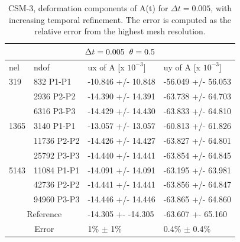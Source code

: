 \begin{table}[h!]
\centering
\begin{tabular}{ |p{1cm}||p{2.7cm}|p{3.3cm}|p{3.3cm}|}
\hline
  \multicolumn{4}{|c|}{$\Delta t = 0.005 \hspace{2mm} \theta = 0.5$} \\
\hline
nel & ndof & ux of A [x $10^{-3}$]  &uy of A [x $10^{-3}$] \\
\hline
    319     & 832 P1-P1 & -10.846       +/-  10.848 & -56.049       +/-  56.053 \\
     & 2936 P2-P2  & -14.390       +/-  14.391 & -63.738       +/-  64.703 \\
      & 6316 P3-P3 & -14.429       +/-  14.430 & -63.833       +/-  64.810 \\
 \hline 
    1365    & 3140 P1-P1 & -13.057       +/-  13.057 & -60.813       +/-  61.826 \\
     & 11736 P2-P2& -14.426       +/-  14.427 & -63.827       +/-  64.801 \\
     & 25792 P3-P3 & -14.440       +/-  14.441 & -63.854       +/-  64.845 \\
 \hline
      5143    & 11084 P1-P1 & -14.091       +/-  14.091 & -63.195       +/-  63.981 \\
     & 42736 P2-P2 & -14.441       +/-  14.441 & -63.856       +/-  64.847 \\
     & 94960 P3-P3 & -14.446       +/-  14.446 & -63.865       +/-  64.860 \\
 \hline
  \multicolumn{2}{|c|}{Reference}  &-14.305 +- -14.305        & -63.607 +- 65.160    \\
   \hline
    \multicolumn{2}{|c|}{Error}  & 1\% $\pm$ 1\% &  0.4\% $\pm$ 0.4\%  \\
   \hline
\end{tabular}
\caption{CSM-3, deformation components of A(t) for $\Delta t = 0.005$, with increasing temporal refinement. The error is computed as the relative error from the highest mesh resolution.}
\label{table:csm32}
\end{table}


